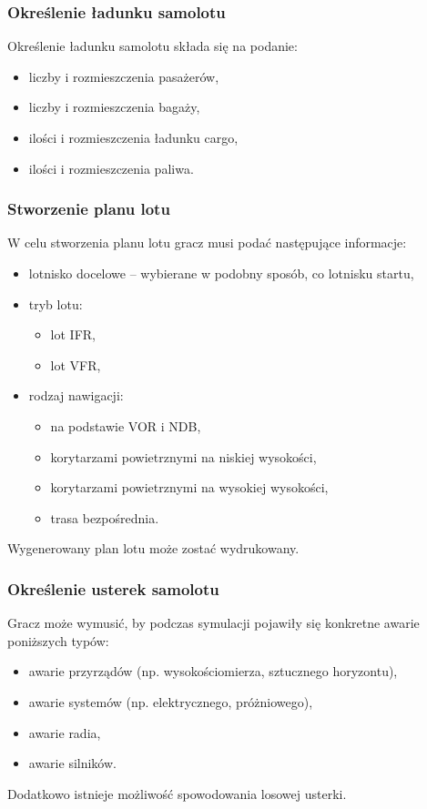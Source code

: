 \documentclass{mwrep}
\begin{document}
\subsubsection{Określenie ładunku samolotu}
Określenie ładunku samolotu składa się na podanie:
\begin{itemize}
\item liczby i rozmieszczenia pasażerów,
\item liczby i rozmieszczenia bagaży,
\item ilości i rozmieszczenia ładunku cargo,
\item ilości i rozmieszczenia paliwa.
\end{itemize}

\subsubsection{Stworzenie planu lotu}
W celu stworzenia planu lotu gracz musi podać następujące informacje:
\begin{itemize}
\item lotnisko docelowe -- wybierane w podobny sposób, co lotnisku startu,
\item tryb lotu:
\begin{itemize}
\item lot IFR,
\item lot VFR,
\end{itemize}
\item rodzaj nawigacji:
\begin{itemize}
\item na podstawie VOR i NDB,
\item korytarzami powietrznymi na niskiej wysokości,
\item korytarzami powietrznymi na wysokiej wysokości,
\item trasa bezpośrednia.
\end{itemize}
\end{itemize}
Wygenerowany plan lotu może zostać wydrukowany.

\subsubsection{Określenie usterek samolotu}
Gracz może wymusić, by podczas symulacji pojawiły się konkretne awarie poniższych typów:
\begin{itemize}
\item awarie przyrządów (np. wysokościomierza, sztucznego horyzontu),
\item awarie systemów (np. elektrycznego, próżniowego),
\item awarie radia,
\item awarie silników.
\end{itemize}
Dodatkowo istnieje możliwość spowodowania losowej usterki.
\end{document}
